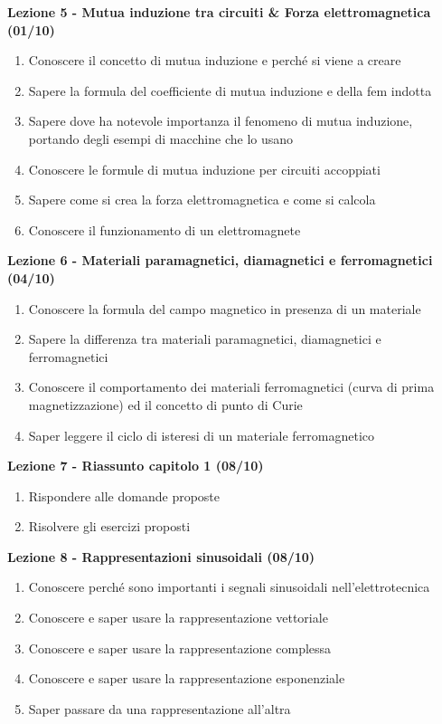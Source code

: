 \documentclass{article}
\begin{document}
\begin{center}
		\textbf{Lezione 5 - Mutua induzione tra circuiti \& Forza elettromagnetica (01/10)}
		\begin{enumerate}
			\item Conoscere il concetto di mutua induzione e perché si viene a creare
			\item Sapere la formula del coefficiente di mutua induzione e della fem indotta
			\item Sapere dove ha notevole importanza il fenomeno di mutua induzione, portando degli esempi di macchine che lo usano
			\item Conoscere le formule di mutua induzione per circuiti accoppiati
			\item Sapere come si crea la forza elettromagnetica e come si calcola
			\item Conoscere il funzionamento di un elettromagnete
		\end{enumerate}

		\textbf{Lezione 6 - Materiali paramagnetici, diamagnetici e ferromagnetici (04/10)}
		\begin{enumerate}
			\item Conoscere la formula del campo magnetico in presenza di un materiale
			\item Sapere la differenza tra materiali paramagnetici, diamagnetici e ferromagnetici
			\item Conoscere il comportamento dei materiali ferromagnetici (curva di prima magnetizzazione) ed il concetto di punto di Curie
			\item Saper leggere il ciclo di isteresi di un materiale ferromagnetico
		\end{enumerate}

	\textbf{Lezione 7 - Riassunto capitolo 1 (08/10)}
	\begin{enumerate}
	\item Rispondere alle domande proposte
	\item Risolvere gli esercizi proposti
	\end{enumerate}

	\textbf{Lezione 8 - Rappresentazioni sinusoidali (08/10)}
	\begin{enumerate}
	\item Conoscere perché sono importanti i segnali sinusoidali nell'elettrotecnica
	\item Conoscere e saper usare la rappresentazione vettoriale
	\item Conoscere e saper usare la rappresentazione complessa
	\item Conoscere e saper usare la rappresentazione esponenziale
	\item Saper passare da una rappresentazione all'altra
	\end{enumerate}


\end{center}
\end{document}
